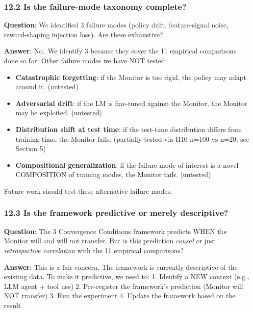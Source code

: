 \documentclass[
]{article}
\providecommand{\tightlist}{%
  \setlength{\itemsep}{0pt}\setlength{\parskip}{0pt}}
\begin{document}
\subsubsection{12.2 Is the failure-mode taxonomy
complete?}\label{is-the-failure-mode-taxonomy-complete}

\textbf{Question}: We identified 3 failure modes (policy drift,
feature-signal noise, reward-shaping injection loss). Are these
exhaustive?

\textbf{Answer}: No.~We identify 3 because they cover the 11 empirical
comparisons done so far. Other failure modes we have NOT tested:

\begin{itemize}
\tightlist
\item
  \textbf{Catastrophic forgetting}: if the Monitor is too rigid, the
  policy may adapt around it. (untested)
\item
  \textbf{Adversarial drift}: if the LM is fine-tuned against the
  Monitor, the Monitor may be exploited. (untested)
\item
  \textbf{Distribution shift at test time}: if the test-time
  distribution differs from training-time, the Monitor fails. (partially
  tested via H10 n=100 vs n=20; see Section 5)
\item
  \textbf{Compositional generalization}: if the failure mode of interest
  is a novel COMPOSITION of training modes, the Monitor fails.
  (untested)
\end{itemize}

Future work should test these alternative failure modes.

\subsubsection{12.3 Is the framework predictive or merely
descriptive?}\label{is-the-framework-predictive-or-merely-descriptive}

\textbf{Question}: The 3 Convergence Conditions framework predicts WHEN
the Monitor will and will not transfer. But is this prediction
\emph{causal} or just \emph{retrospective correlation} with the 11
empirical comparisons?

\textbf{Answer}: This is a fair concern. The framework is currently
descriptive of the existing data. To make it predictive, we need to: 1.
Identify a NEW context (e.g., LLM agent + tool use) 2. Pre-register the
framework's prediction (Monitor will NOT transfer) 3. Run the experiment
4. Update the framework based on the result
\end{document}
